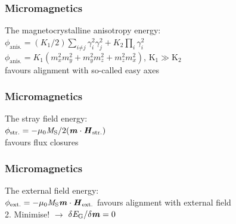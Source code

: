 \documentclass{beamer}
\begin{document}
        \begin{frame}
          \frametitle{Micromagnetics}
          \color{ImperialNavy}\huge{The magnetocrystalline anisotropy energy:}\\
          \Large  $\phi_{\text{anis.}}=(\textit{K}_\text{1}/\text{2})\sum_{\textit{i}\neq \textit{j}}\gamma_{\textit{i}}^{\text{2}}\gamma_{\textit{j}}^{\text{2}} + \textit{K}_{\text{2}}\prod_{\textit{i}}\gamma_{\textit{i}}^{\text{2}}$\\
                  $\phi_{\text{anis.}}=\textit{K}_\text{1}\left( \textit{m}_{\textit{x}}^{\text{2}}\textit{m}_{\textit{y}}^{\text{2}}+\textit{m}_{\textit{y}}^{\text{2}}\textit{m}_{\textit{z}}^{\text{2}}+\textit{m}_{\textit{z}}^{\text{2}}\textit{m}_{\textit{x}}^{\text{2}}  \right)$,  $\text{K}_\text{1}\gg\text{K}_\text{2}$\\
        \vspace{2mm} \large \alert{favours alignment with so-called easy axes}
        \end{frame}


        \begin{frame}
          \frametitle{Micromagnetics}
          \color{ImperialNavy}\huge{The stray field energy:}\\
          \center $\phi_{\text{str.}}=-\mu_{\text{0}}\textit{M}_{\text{S}}/\text{2}(\textbf{\textit{m}}\cdot\textbf{\textit{H}}_{\text{str.}})$\\
          \vspace{2mm} \flushleft \large \alert{favours flux closures}
        \end{frame}


        \begin{frame}
          \frametitle{Micromagnetics}
          \color{ImperialNavy}\huge{The external field energy:}\\
          \center $\phi_{\text{ext.}}=-\mu_{\text{0}}\textit{M}_{\text{S}}\textbf{\textit{m}}\cdot\textbf{\textit{H}}_{\text{ext.}}$
          \vspace{2mm} \flushleft \large \alert{favours alignment with external field}\\
          \vspace{4mm} \LARGE \alert{2.} Minimise! $\rightarrow$  $\delta\textit{E}_{\text{G}}/\delta\textbf{\textit{m}}=\text{0}$
        \end{frame}
\end{document}
